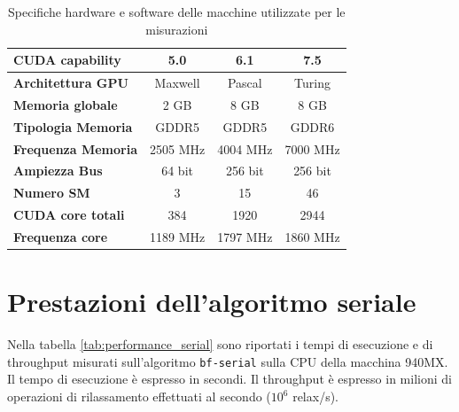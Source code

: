 \documentclass[12pt,a4paper,oneside]{book}
\renewcommand{\arraystretch}{1.1}
\begin{document}
\begin{table}[!ht]
{\begin{tabular}{|l|c|c|c|}
				\textbf{CUDA capability} & 5.0 & 6.1 & 7.5 \\ \hline
				\textbf{Architettura GPU} & Maxwell & Pascal & Turing \\ \hline
				\textbf{Memoria globale} & 2 GB & 8 GB & 8 GB \\ \hline
				\textbf{Tipologia Memoria} & GDDR5 & GDDR5 & GDDR6 \\ \hline
				\textbf{Frequenza Memoria} & 2505 MHz & 4004 MHz & 7000 MHz \\ \hline
				\textbf{Ampiezza Bus} & 64 bit & 256 bit & 256 bit \\ \hline
				\textbf{Numero SM} & 3 & 15 & 46 \\ \hline
				\textbf{CUDA core totali} & 384 & 1920 & 2944 \\ \hline
				\textbf{Frequenza core} & 1189 MHz & 1797 MHz & 1860 MHz \\ \hline
			\end{tabular}
		}
		\caption{Specifiche hardware e software delle macchine utilizzate per le misurazioni}
		\label{tab:specs}
	\end{table}
	\renewcommand{\arraystretch}{1.1}

	\section{Prestazioni dell'algoritmo seriale}
	Nella tabella \ref{tab:performance_serial} sono riportati i tempi di esecuzione e di throughput misurati sull'algoritmo \texttt{bf-serial} sulla CPU della macchina 940MX. Il tempo di esecuzione è espresso in secondi. Il throughput è espresso in milioni di operazioni di rilassamento effettuati al secondo ($10^6$ relax/s).
	
\end{document}
